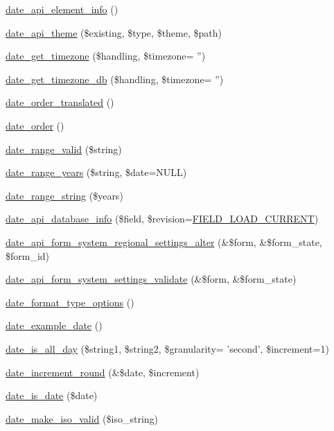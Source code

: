 \begin{DoxyCompactItemize}
\item 
\hyperlink{date__api_8module_a6b1b048f77260adfcab2add33ded37ec}{date\_\-api\_\-element\_\-info} ()
\item 
\hyperlink{date__api_8module_a9a35f6b3d4939f8df7d17ba1758aff7f}{date\_\-api\_\-theme} (\$existing, \$type, \$theme, \$path)
\item 
\hyperlink{date__api_8module_a623c76f08925c3c7699ca6d07da0d176}{date\_\-get\_\-timezone} (\$handling, \$timezone= '')
\item 
\hyperlink{date__api_8module_ac541e9141accfab7c7ace5ea3b54b7f8}{date\_\-get\_\-timezone\_\-db} (\$handling, \$timezone= '')
\item 
\hyperlink{date__api_8module_aa8e424ca2cbdf83c3f16be8192370ed8}{date\_\-order\_\-translated} ()
\item 
\hyperlink{date__api_8module_a44f5858b603c1aa92edba8f3c4cb2f5f}{date\_\-order} ()
\item 
\hyperlink{date__api_8module_a309e79ef85633987ce9641647d2e30ba}{date\_\-range\_\-valid} (\$string)
\item 
\hyperlink{date__api_8module_ad70e453c5a043e53649a771c3a6713cf}{date\_\-range\_\-years} (\$string, \$date=NULL)
\item 
\hyperlink{date__api_8module_abf93ddac7557727dde44e458d4471821}{date\_\-range\_\-string} (\$years)
\item 
\hyperlink{date__api_8module_a53245efe16c2d5ae6063e784952ef164}{date\_\-api\_\-database\_\-info} (\$field, \$revision=\hyperlink{group__field_ga39b9fb0d47b181607a4d981a9bccbe8a}{FIELD\_\-LOAD\_\-CURRENT})
\item 
\hyperlink{date__api_8module_acbea03931dc33c56ac72db2c8042f7a5}{date\_\-api\_\-form\_\-system\_\-regional\_\-settings\_\-alter} (\&\$form, \&\$form\_\-state, \$form\_\-id)
\item 
\hyperlink{date__api_8module_affcb2404b858829a6c6f2ac740541948}{date\_\-api\_\-form\_\-system\_\-settings\_\-validate} (\&\$form, \&\$form\_\-state)
\item 
\hyperlink{date__api_8module_ac1f737576353f61bc4b608ceb7cf76dc}{date\_\-format\_\-type\_\-options} ()
\item 
\hyperlink{date__api_8module_a01fa4c61620fadb6556eebfe51839314}{date\_\-example\_\-date} ()
\item 
\hyperlink{date__api_8module_a7a70b1226d53abc183edbf3dd1d8e7c7}{date\_\-is\_\-all\_\-day} (\$string1, \$string2, \$granularity= 'second', \$increment=1)
\item 
\hyperlink{date__api_8module_aad7435d8e7bdaed55be4d4934436d35c}{date\_\-increment\_\-round} (\&\$date, \$increment)
\item 
\hyperlink{date__api_8module_a1b6599e19acaf15b43eddb03b748b496}{date\_\-is\_\-date} (\$date)
\item 
\hyperlink{date__api_8module_afef4f46bfc76d3242b4ad842aa0fd225}{date\_\-make\_\-iso\_\-valid} (\$iso\_\-string)
\end{DoxyCompactItemize}


